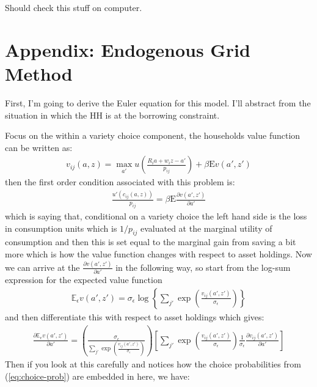 \documentclass[12pt,pdftex]{article}
\begin{document}
\begin{onehalfspacing}
Should check this stuff on computer. 





\newpage


\section{Appendix: Endogenous Grid Method}

First, I'm going to derive the Euler equation for this model. I'll abstract from the situation in which the HH is at the borrowing constraint.

Focus on the within a variety choice component, the households value function can be written as:
\begin{align}
v_{ij}(a, z) = \max_{a'} u \left( \frac{R_i a + w_i z - a'}{p_{ij}} \right) + \beta  \mathrm{E} v(a', z')
\end{align}
then the first order condition associated with this problem is:
\begin{align}
\frac{u'(c_{ij}(a, z))}{p_{ij}} = \beta \mathrm{E} \frac{\partial v(a', z')}{\partial a'}
\end{align}
which is saying that, conditional on a variety choice the left hand side is the loss in consumption units which is $1 / p_{ij}$ evaluated at the marginal utility of consumption and then this is set equal to the marginal gain from saving a bit more which is how the value function changes with respect to asset holdings. Now we can arrive at the $\frac{\partial v(a', z')}{\partial a'}$ in the following way, so start from the log-sum expression for the expected value function
\begin{align}
\mathbb{E}_{\epsilon} v(a', z') =  \sigma_{\epsilon} \log \left\{ \sum_{j'} \exp \left( \frac{  v_{ij}(a', z')}{\sigma_{\epsilon}} \right) \right\}
\end{align}
and then differentiate this with respect to asset holdings which gives:
\begin{align}
\frac{\partial \mathbb{E}_{\epsilon} v(a', z')}{\partial a'} = \left( \frac{\sigma_{\epsilon}}{\sum_{j'} \exp \left( \frac{  v_{ij}(a', z')}{\sigma_{\epsilon}}\right)} \right)
\left[ \sum_{j'} \exp \left( \frac{  v_{ij}(a', z')}{\sigma_{\epsilon}}\right) \frac{1}{\sigma_{\epsilon}} \frac{\partial v_{ij}(a', z')}{\partial a'}  \right]
\end{align}
Then if you look at this carefully and notices how the choice probabilities from (\ref{eq:choice-prob}) are embedded in here, we have:
\begin{align}

\end{align}
\end{onehalfspacing}
\end{document}
